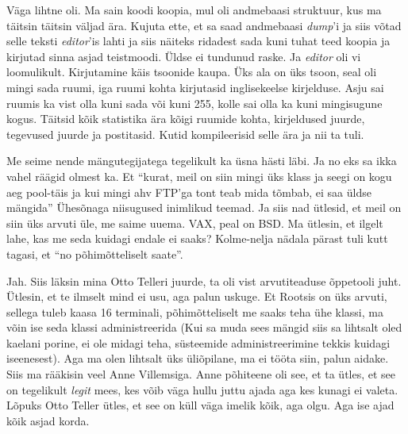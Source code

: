 Väga lihtne oli. Ma sain koodi koopia, mul oli andmebaasi struktuur, kus ma 
täitsin täitsin väljad ära. Kujuta ette, et sa saad andmebaasi \emph{dump}'i ja 
siis võtad selle teksti \emph{editor}'is lahti ja siis  näiteks ridadest sada 
kuni tuhat teed koopia ja  kirjutad sinna asjad teistmoodi. Üldse ei tundunud 
raske. Ja \emph{editor} oli vi 
loomulikult. Kirjutamine käis tsoonide kaupa. Üks ala on üks tsoon, seal oli 
mingi sada ruumi, iga ruumi kohta kirjutasid inglisekeelse kirjelduse. Asju sai 
ruumis ka vist olla kuni sada või kuni 255, kolle sai olla ka kuni mingisugune 
kogus. Täitsid kõik statistika ära kõigi ruumide kohta, kirjeldused juurde, 
tegevused juurde ja postitasid. Kutid kompileerisid selle ära ja nii ta tuli. 

Me seime nende mängutegijatega tegelikult ka üsna hästi läbi. Ja no eks sa ikka 
vahel räägid olmest ka. Et \enquote{kurat, meil on siin mingi üks klass ja 
seegi  on kogu aeg pool-täis ja kui mingi ahv FTP'ga tont teab mida tõmbab, ei 
saa üldse mängida} Ühesõnaga niisugused inimlikud teemad. Ja siis nad ütlesid, 
et meil on siin üks arvuti üle, me saime uuema. VAX, peal on 
BSD. Ma ütlesin, et ilgelt lahe, kas me seda kuidagi endale ei 
saaks? Kolme-nelja nädala pärast tuli kutt tagasi, et \enquote{no 
põhimõtteliselt saate}. 


Jah. Siis läksin mina Otto Telleri juurde, ta oli vist 
arvutiteaduse õppetooli juht. Ütlesin, et te ilmselt mind ei usu, aga palun 
uskuge. Et Rootsis on üks arvuti, sellega tuleb kaasa 16 terminali, 
põhimõtteliselt me saaks teha ühe klassi, ma võin ise seda klassi 
administreerida (Kui sa muda sees mängid siis sa lihtsalt oled kaelani porine, 
ei ole midagi teha, süsteemide administreerimine tekkis  kuidagi iseenesest). 
Aga ma olen lihtsalt üks üliõpilane, ma ei tööta siin, palun aidake. Siis ma 
rääkisin veel Anne Villemsiga. Anne põhiteene oli 
see, et ta ütles, et see on tegelikult \emph{legit} mees, kes võib väga hullu 
juttu ajada aga kes kunagi ei valeta. Lõpuks Otto Teller ütles, et see on küll 
väga imelik kõik, aga olgu. Aga ise ajad kõik asjad korda.

